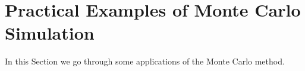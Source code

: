 %
%
%

\section{Practical Examples of Monte Carlo Simulation}
\label{example-of-monte-carlo-simulation}

In this Section we go through some applications of the Monte Carlo method.

